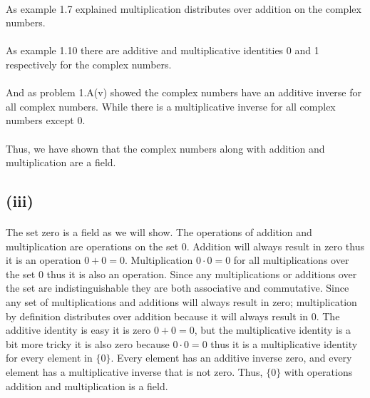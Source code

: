 \documentclass{article}
\begin{document}
      \paragraph{}
      As example 1.7 explained multiplication distributes over addition on the complex numbers.

      \paragraph{}
      As example 1.10 there are additive and multiplicative identities 0 and 1 respectively for the complex numbers.

      \paragraph{}
      And as problem 1.A(v) showed the complex numbers have an additive inverse for all complex numbers. While there is a multiplicative inverse for all complex numbers except 0.

      \paragraph{}
      Thus, we have shown that the complex numbers along with addition and multiplication are a field.

    \subsection*{(iii)}
      \paragraph{}
      The set zero is a field as we will show. The operations of addition and multiplication are operations on the set 0. Addition will always result in zero thus it is an operation $ 0 + 0 = 0$. Multiplication $0 \cdot 0 = 0$ for all multiplications over the set 0 thus it is also an operation. Since any multiplications or additions over the set are indistinguishable they are both associative and commutative. Since any set of multiplications and additions will always result in zero; multiplication by definition distributes over addition because it will always result in 0. The additive identity is easy it is zero $0 + 0 = 0$, but the multiplicative identity is a bit more tricky it is also zero because $0 \cdot 0 = 0$ thus it is a multiplicative identity for every element in $\{0\}$. Every element has an additive inverse zero, and every element has a multiplicative inverse that is not zero. Thus, $\{0\}$ with operations addition and multiplication is a field.
\end{document}
